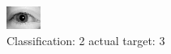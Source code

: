 \begin{figure}[h!]
\begin{center}
\includegraphics[width=0.60\columnwidth]{figures/ID3092_class_2_target_3.png}
\end{center}
\caption{ Classification: 2 actual target: 3}
\label{fig:ID3092_class_2_target_3}
\end{figure}
